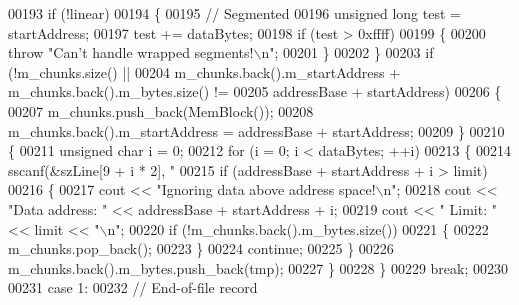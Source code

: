 \begin{DoxyCode}
{{00193                     \textcolor{keywordflow}{if} (!linear)
00194                     \{
00195                         \textcolor{comment}{// Segmented}
00196                         \textcolor{keywordtype}{unsigned} \textcolor{keywordtype}{long} test = startAddress;
00197                         test += dataBytes;
00198                         \textcolor{keywordflow}{if} (test > 0xffff)
00199                         \{
00200                             \textcolor{keywordflow}{throw} \textcolor{stringliteral}{"Can't handle wrapped segments!\(\backslash\)n"};
00201                         \}
00202                     \}
00203                     \textcolor{keywordflow}{if} (!m\_chunks.size() ||
00204                         m\_chunks.back().m\_startAddress + m\_chunks.back().m\_bytes.size() !=
00205                         addressBase + startAddress)
00206                     \{
00207                         m\_chunks.push\_back(MemBlock());
00208                         m\_chunks.back().m\_startAddress = addressBase + startAddress;
00209                     \}
00210                     \{
00211                         \textcolor{keywordtype}{unsigned} \textcolor{keywordtype}{char} i = 0;
00212                         \textcolor{keywordflow}{for} (i = 0; i < dataBytes; ++i)
00213                         \{
00214                             sscanf(&szLine[9 + i * 2], \textcolor{stringliteral}{"%
00215                             \textcolor{keywordflow}{if} (addressBase + startAddress + i > limit)
00216                             \{
00217                                 cout << \textcolor{stringliteral}{"Ignoring data above address space!\(\backslash\)n"};
00218                                 cout << \textcolor{stringliteral}{"Data address: "} << addressBase + startAddress + 
      i;
00219                                 cout << \textcolor{stringliteral}{" Limit: "} << limit << \textcolor{stringliteral}{"\(\backslash\)n"};
00220                                 \textcolor{keywordflow}{if} (!m\_chunks.back().m\_bytes.size())
00221                                 \{
00222                                     m\_chunks.pop\_back();
00223                                 \}
00224                                 \textcolor{keywordflow}{continue};
00225                             \}
00226                             m\_chunks.back().m\_bytes.push\_back(tmp);
00227                         \}
00228                     \}
00229                     \textcolor{keywordflow}{break};
00230 
00231                 \textcolor{keywordflow}{case} 1:
00232                     \textcolor{comment}{// End-of-file record}
}}}
\end{DoxyCode}
